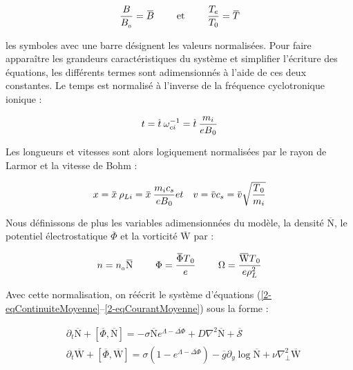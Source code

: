 \begin{refsection}
\begin{equation}
\frac{B}{B_{\indice{0}}}=\overbar{B}\text{~~~~~~~et~~~~~~~}\frac{T_e}{T_0}=\overbar{T}
\end{equation}

les symboles avec une barre désignent les valeurs normalisées. Pour faire
apparaître les grandeurs caractéristiques du système et simplifier l'écriture
des équations, les différents termes sont adimensionnés à l'aide de ces deux
constantes. Le temps est normalisé à l'inverse de la fréquence cyclotronique ionique :

\begin{equation}
t = \overbar{t}\:\omega_{ci}\puissance{-1} =
\overbar{t}\:\frac{m_i}{eB\indice{0}}
\end{equation}

Les longueurs et vitesses sont alors logiquement normalisées par le rayon de
Larmor et la vitesse de Bohm :

\begin{eqnarray}
x = \overbar{x}\:\rho_{Li} =
\overbar{x}\:\frac{m_ic_s}{eB\indice{0}} &
et &
v=\overbar{v}c_s=\overbar{v}\sqrt{\frac{T\indice{0}}{m_i}}
\end{eqnarray}

Nous définissons de plus les variables adimensionnées du modèle, la densité
$\overbar{\text{N}}$, le potentiel électrostatique $\overbar{\Phi}$ et la
vorticité $\overbar{\text{W}}$ par :

\begin{eqnarray}
n = n_{\indice{0}}\overbar{\text{N}} \text{~~~~~~~} \Phi=\frac{\overbar{\Phi}
T\indice{0}}{e}
\text{~~~~~~~} \Omega=\frac{\overbar{\text{W}} T\indice{0}}{e\rho_L^2}
\end{eqnarray}

Avec cette normalisation, on
réécrit le système d'équations
(\eqref{2-eqContinuiteMoyenne}--\eqref{2-eqCourantMoyenne}) sous la forme :

\begin{align}
\label{2-eqContinuiteNorm}
&\partial_t \overbar{\text{N}}
+\left[\overbar{\Phi},\overbar{\text{N}}\right] = -\sigma
\overline{\text{N}}e^{\Lambda-\overline{\Delta\Phi}} + D\nabla^2
\overline{\text{N}} +
\overline{\mathcal{S}}
\\
\label{2-eqCourantNorm}
&\partial_{t}\overbar{\text{W}} + 
\left[\overbar{\Phi},\overbar{\text{W}}\right] =
\sigma\left(1-e^{\Lambda-\overbar{\Delta\Phi}}\right) 
-\overbar{g}\partial_y\log\overbar{\text{N}}
+\nu\nabla_\perp^2\overbar{\text{W}}
\end{align}


\end{refsection}
